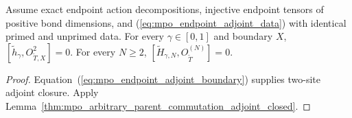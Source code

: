 \begin{lemma}
    \label{lem:mpo_mixed_endpoint_adjoint_commutation}
    \leanok
    Assume exact endpoint action decompositions, injective endpoint
    tensors of positive bond dimensions, and
    (\ref{eq:mpo_endpoint_adjoint_data}) with identical primed and
    unprimed data. For every $\gamma\in[0,1]$ and boundary $X$,
    $[\widetilde h_\gamma,O^2_{\widetilde T,X}]=0$.
    For every $N\geq2$,
    $[\widetilde H_{\gamma,N},O^{(N)}_{\widetilde T}]=0$.
\end{lemma}
\begin{proof}
    \leanok
    Equation~(\ref{eq:mpo_endpoint_adjoint_boundary}) supplies two-site
    adjoint closure. Apply
    Lemma~\ref{thm:mpo_arbitrary_parent_commutation_adjoint_closed}.
\end{proof}

